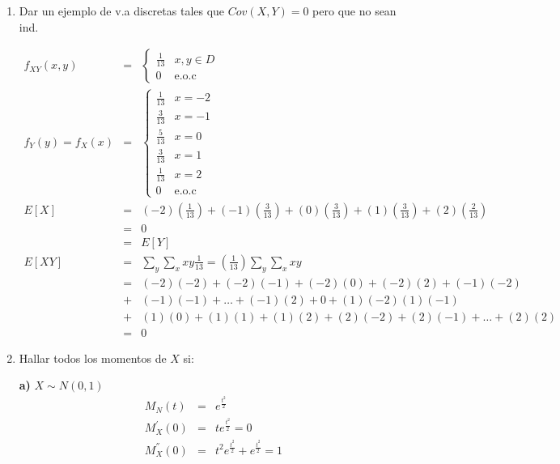 \begin{enumerate}
\item Dar un ejemplo de v.a discretas tales que $Cov\left(X,Y \right)=0$ pero que no sean ind.

\begin{eqnarray*} 
f_{XY}\left(x,y \right)&=&\begin{cases}
\frac{1}{13} & x,y \in D \\
0 & \textrm{e.o.c}
\end{cases}\\
f_{Y}\left(y \right)= f_{X}\left(x\right)&=& \begin{cases}
\frac{1}{13} & x=-2 \\
\frac{3}{13} & x=-1 \\
\frac{5}{13} & x=0 \\
\frac{3}{13} & x=1 \\
\frac{1}{13} & x=2 \\
0 & \textrm{e.o.c}
\end{cases}\\
E\left[X \right]&=& \left(-2 \right)\left(\frac{1}{13}\right)+ \left(-1 \right) \left(\frac{3}{13}\right)+ \left(0 \right)\left(\frac{3}{13}\right)+ \left(1 \right)\left(\frac{3}{13}\right)+ \left(2 \right) \left(\frac{2}{13}\right)\\
&=& 0\\
&=& E \left[Y \right]\\
E \left[XY \right] &=& \sum_{y} \sum_{x} xy \frac{1}{13}= \left( \frac{1}{13} \right)\sum_{y} \sum_{x} xy\\
&=& \left(-2 \right) \left(-2 \right) + \left(-2 \right)\left(-1\right)+ \left(-2 \right)\left(0\right)+ \left(-2\right)\left(2\right)+ \left(-1 \right)\left(-2\right)\\
&+& \left( -1\right)\left(-1 \right)+ \ldots + \left(-1 \right)\left(2\right)+0+ \left(1 \right)\left(-2\right)\left(1 \right)\left(-1\right)\\
&+& \left(1 \right)\left(0\right)+ \left(1 \right)\left(1\right)+ \left(1 \right)\left(2\right)+ \left(2 \right)\left(-2\right)+ \left(2 \right)\left(-1\right)+ \ldots + \left(2 \right)\left(2\right)\\
&=& 0
\end{eqnarray*}

\item Hallar todos los momentos de $X$ si:

\smallskip
\textbf{a)} $X \sim  N \left(0,1\right)$
\begin{eqnarray*} 
M_{N}\left(t \right)&=& e^{\frac{t^2}{2}}\\
M^{'}_{X} \left(0 \right)&=& te^{\frac{t^2}{2}}=0\\
M^{''}_{X} \left(0 \right)&=& t^{2}e^{\frac{t^2}{2}}+ e^{\frac{t^2}{2}}=1\\
\end{eqnarray*}


\end{enumerate}
